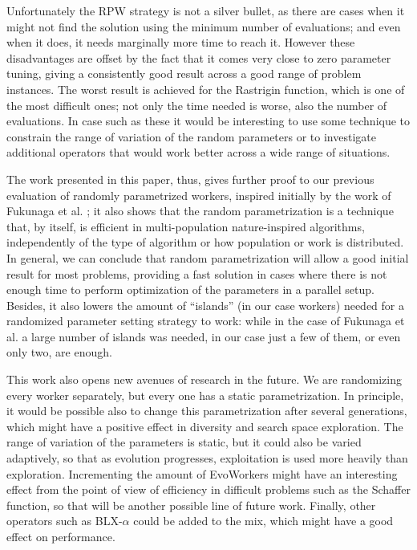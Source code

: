 \documentclass[conference]{IEEEtran}
\begin{document}
Unfortunately the RPW strategy is not a silver bullet, as there are cases
when it might not find the solution using the minimum number of
evaluations; and even when it does, it needs marginally more time to
reach it. However these disadvantages are
offset by the fact that it comes very close to zero parameter tuning,
giving a consistently good result across a good range of problem instances.
The worst result is achieved for the Rastrigin function, which
is one of the most difficult ones; not only the time needed is worse,
also the number of evaluations. In case such as these it would be
interesting to use some technique to constrain the range of variation
of the random parameters or to investigate additional operators that
would work better across a wide range of situations.

The work presented in this paper, thus, gives further proof to our
previous evaluation of randomly parametrized workers, inspired
initially by the work of Fukunaga et al. \cite{fuku1}; it also shows that the random
parametrization is a technique that, by itself, is efficient in
multi-population nature-inspired algorithms, independently of the type
of algorithm or how population or work is distributed. In general, we
can conclude that 
random parametrization will allow a good initial result for most
problems, providing a fast solution in cases where there is not enough
time to perform optimization of the parameters in a parallel
setup. Besides, it also lowers the amount of ``islands'' (in our case
workers) needed for a randomized parameter setting strategy to work:
while in the case of Fukunaga et al. \cite{fuku1} a large number of islands was
needed, in our case just a few of them, or even only two, are
enough.

This work also opens new avenues of research in the future. We are
randomizing every worker separately, but every one has a static
parametrization. In principle, it would be possible also to change
this parametrization after several generations, which might have a
positive effect in diversity and search space exploration. The range
of variation of the parameters is static, but it could also be varied
adaptively, so that as evolution progresses, exploitation is used more
heavily than exploration. Incrementing the amount of EvoWorkers might
have an interesting effect from the point of view of efficiency in
difficult problems such as the Schaffer function, so that will be
another possible line of future work.
Finally, other operators such as
BLX-$\alpha$ could be added to the mix, which might have a good effect
on performance.
\end{document}
